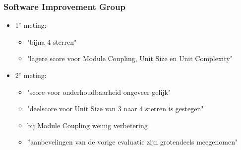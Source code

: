 \begin{frame}\frametitle{Software Improvement Group}
    \hfill
    \begin{itemize}
        \item 1$^e$ meting:
        \begin{itemize}
            \item "bijna 4 sterren"
            \item "lagere score voor Module Coupling, Unit Size en Unit Complexity"
        \end{itemize}
        \item 2$^e$ meting:
            \begin{itemize}
                \item "score voor onderhoudbaarheid ongeveer gelijk"
                \item "deelscore voor Unit Size van 3 naar 4 sterren is gestegen"
                \item bij Module Coupling weinig verbetering
                \item ''aanbevelingen van de vorige evaluatie zijn grotendeels meegenomen"
            \end{itemize}
    \end{itemize}
\end{frame}
